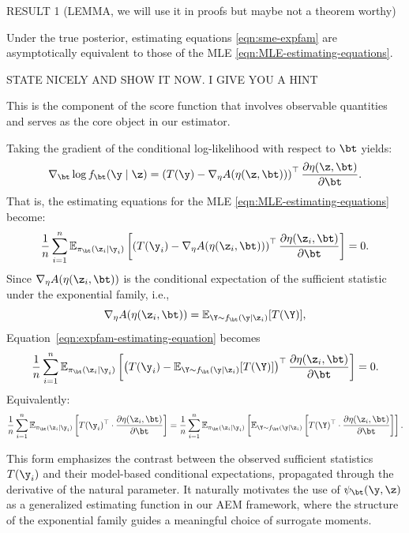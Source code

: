 RESULT 1 (LEMMA, we will use it in proofs but maybe not a theorem worthy)

Under the true posterior, estimating equations \eqref{eqn:sme-expfam} are asymptotically equivalent to those of the MLE \eqref{eqn:MLE-estimating-equations}. 

STATE NICELY AND SHOW IT NOW. I GIVE YOU A HINT






This is the component of the score function that involves observable quantities and serves as the core object in our estimator.


Taking the gradient of the conditional log-likelihood with respect to \(\bt\) yields:
\[
\nabla_\bt \log f_\bt(\y \mid \z) = \left( T(\y) - \nabla_\eta A(\eta(\z, \bt)) \right)^\top \frac{\partial \eta(\z, \bt)}{\partial \bt}.
\]
%
That is, the estimating equations for the MLE \eqref{eqn:MLE-estimating-equations} become:
%
\begin{equation}
\label{eqn:expfam-estimating-equation}
\frac{1}{n} \sum_{i=1}^n 
\mathbb{E}_{\pi_\bt(\z_i \mid \y_i)} 
\left[
\left( T(\y_i) - \nabla_\eta A(\eta(\z_i, \bt)) \right)^\top 
\frac{\partial \eta(\z_i, \bt)}{\partial \bt}
\right]
= 0.
\end{equation}
%
Since \( \nabla_\eta A(\eta(\z_i, \bt)) \) is the conditional expectation of the sufficient statistic under the exponential family, i.e.,
\[
\nabla_\eta A(\eta(\z_i, \bt)) = \mathbb{E}_{\Y \sim f_\bt(\y \mid \z_i)}[T(\Y)],
\]
Equation~\eqref{eqn:expfam-estimating-equation} becomes
\begin{equation}
\label{eqn:expfam-estimating-equation-clean}
\frac{1}{n} \sum_{i=1}^n 
\mathbb{E}_{\pi_\bt(\z_i \mid \y_i)} 
\left[
\left( T(\y_i) - \mathbb{E}_{\Y \sim f_\bt(\y \mid \z_i)}[T(\Y)] \right)^\top 
\frac{\partial \eta(\z_i, \bt)}{\partial \bt}
\right]
= 0.
\end{equation}
%
Equivalently:
%
\begin{equation}
\label{eqn:expfam-estimating-equation-split-correct}
\frac{1}{n} \sum_{i=1}^n 
\mathbb{E}_{\pi_\bt(\z_i \mid \y_i)} 
\left[ 
T(\y_i)^\top 
\cdot 
\frac{\partial \eta(\z_i, \bt)}{\partial \bt}
\right]
=
\frac{1}{n} \sum_{i=1}^n 
\mathbb{E}_{\pi_\bt(\z_i \mid \y_i)} 
\left[ 
\mathbb{E}_{\Y \sim f_\bt(\y \mid \z_i)}\left[T(\Y)^\top 
\cdot 
\frac{\partial \eta(\z_i, \bt)}{\partial \bt}\right]
\right].
\end{equation}



This form emphasizes the contrast between the observed sufficient statistics \( T(\y_i) \) and their model-based conditional expectations, propagated through the derivative of the natural parameter. It naturally motivates the use of \( \psi_\bt(\y, \z) \) as a generalized estimating function in our AEM framework, where the structure of the exponential family guides a meaningful choice of surrogate moments.


